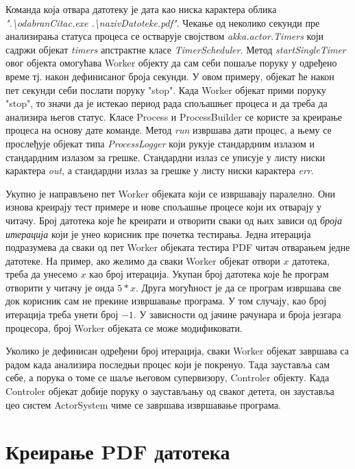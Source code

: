 \documentclass[12pt,oneside]{memoir}
\begin{document}
Команда која отвара датотеку је дата као ниска карактера облика \textit{".\textbackslash odabranCitac.exe .\textbackslash nazivDatoteke.pdf"}. Чекање од неколико секунди пре анализирања статуса процеса се остварује својством \textit{akka.actor.Timers} који садржи објекат \textit{timers} апстрактне класе \textit{TimerScheduler}. Метод \textit{startSingleTimer} овог објекта омогућава Worker објекту да сам себи пошаље поруку у одређено време тј. након дефинисаног броја секунди. У овом примеру, објекат ће након пет секунди себи послати поруку "stop". Када Worker објекат прими поруку "stop", то значи да је истекао период рада спољашњег процеса и да треба да анализира његов статус. Класе Process и ProcessBuilder се користе за креирање процеса на основу дате команде. Метод \textit{run} извршава дати процес, а њему се прослеђује објекат типа \textit{ProcessLogger} који рукује стандардним излазом и стандардним излазом за грешке. Стандардни излаз се уписује у листу ниски карактера \textit{out}, а стандардни излаз за грешке у листу ниски карактера \textit{err}.

Укупно је направљено пет Worker објеката који се извршавају паралелно. Они изнова креирају тест примере и нове спољашње процесе који их отварају у читачу. Број датотека које ће креирати и отворити сваки од њих зависи од \textit{броја итерација} који је унео корисник пре почетка тестирања. Једна итерација подразумева да сваки од пет Worker објеката тестира PDF читач отварањем једне датотеке. На пример, ако желимо да сваки Worker објекат отвори $x$ датотека, треба да унесемо $x$ као број итерација. Укупан број датотека које ће програм отворити у читачу је онда $5*x$. Друга могућност је да се програм извршава све док корисник сам не прекине извршавање програма. У том случају, као број итерација треба унети број $-1$. У зависности од јачине рачунара и броја језгара процесора, број Worker објеката се може модификовати.

Уколико је дефинисан одређени број итерација, сваки Worker објекат завршава са радом када анализира последњи процес који је покренуо. Тада зауставља сам себе, а порука о томе се шаље његовом супервизору, Controler објекту. Када Controler објекат добије поруку о заустављању од сваког детета, он зауставља цео систем ActorSystem чиме се завршава извршавање програма.

\section{Креирање PDF датотека}
\label{sec:kreiranjeDat}
\end{document}
